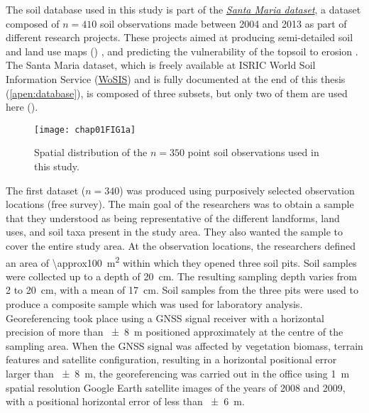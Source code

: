 The soil database used in this study is part of the 
\hyperref[apen:database]{\textit{Santa Maria dataset}}, a dataset composed of $n = 410$ soil 
observations made between \num{2004} and \num{2013} as part of different research
projects. These projects aimed at producing semi-detailed soil and land use maps () 
\citep{Pedron2005, Miguel2010, SamuelRosaEtAl2011a, MiguelEtAl2012, Samuel-RosaEtAl2013}, and 
predicting the vulnerability of the topsoil to erosion \citep{MouraBueno2012, Miguel2013}. 
The Santa Maria dataset, which is freely available at ISRIC World Soil Information Service 
(\href{http://www.isric.org/data/wosis}{WoSIS}) and is fully documented at the end of this thesis
(\autoref{apen:database}), is composed of three subsets, but only two of them are used here 
().

\begin{figure}[!ht]
  \centering
  \texttt{[image: chap01FIG1a]}
  \caption{Spatial distribution of the $n = 350$ point soil observations used in this study.}
  \label{fig:intro-database}
\end{figure}

The first dataset ($n = 340$) was produced using purposively selected observation locations (free 
survey). The main goal of the researchers was to obtain a sample that they understood as being 
representative of the different landforms, land uses, and soil taxa present in the study area. They 
also wanted the sample to cover the entire study area. At the observation locations, the 
researchers defined an area of \SI{\approx100}{\metre\squared} within which they opened three 
soil pits. Soil samples were collected up to a depth of \SI{20}{\centi\metre}. The resulting 
sampling depth varies from \num{2} to \SI{20}{\centi\metre}, with a mean of \SI{17}{\centi\metre}. 
Soil samples from the three pits were used to produce a composite sample which was used for 
laboratory analysis. Georeferencing took place using a GNSS signal receiver with a horizontal 
precision of more than \SI{\pm8}{\metre} positioned approximately at the centre of the sampling 
area. When the GNSS signal was affected by vegetation biomass, terrain features and satellite 
configuration, resulting in a horizontal positional error larger than \SI{\pm8}{\metre}, the 
georeferencing was carried out in the office using \SI{1}{\metre} spatial resolution Google Earth 
satellite images of the years of 2008 and 2009, with a positional horizontal error of less than 
\SI{\pm6}{\metre}.

